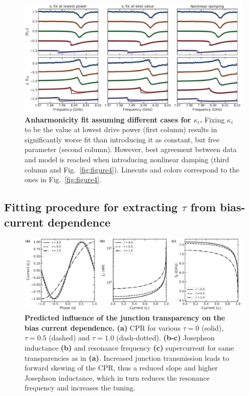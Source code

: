\begin{figure}
	\centering
	\includegraphics[width=\linewidth]{chapter-gJJ-CPR/figs/SMFigure-power}
	\caption{
		\textbf{Anharmonicity fit assuming different cases for $\kappa_i$.}
		Fixing $\kappa_i$ to be the value at lowest drive power (first column) results in significantly worse fit than introducing it as constant, but free parameter (second column).
		However, best agreement between data and model is reached when introducing nonlinear damping (third column and Fig.~\ref{fig:figure4}).
		Linecuts and colors correspond to the ones in Fig.~\ref{fig:figure4}.
	}
	\label{fig:SMpower}
\end{figure}

\subsection{Fitting procedure for extracting $\tau$ from bias-current dependence}\label{sec:fitbiascurrent}

\begin{figure}
	\centering
	\includegraphics[width=\linewidth]{chapter-gJJ-CPR/figs/SMFigure-influence}
	\caption{
		\textbf{Predicted influence of the junction transparency on the bias current dependence.}
		\textbf{(a)} CPR for various $\tau=0$ (solid), $\tau=0.5$ (dashed) and $\tau=1.0$	(dash-dotted).
		\textbf{(b-c)} Josephson inductance \textbf{(b)} and resonance frequency \textbf{(c)} supercurrent for	same transparencies as in \textbf{(a)}.
		Increased junction transmission leads to forward skewing of the CPR, thus a reduced slope and higher Josephson inductance, which in turn reduces the resonance frequency and increases the tuning.
	}
	\label{fig:SMinfluence}
\end{figure}

